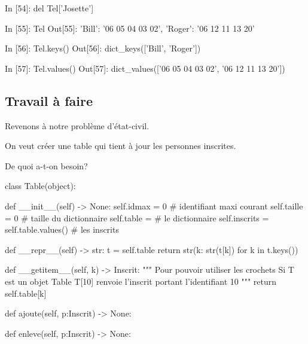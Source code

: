 \documentclass[french]{beamer}
\begin{document}
\begin{frame}[fragile]
\begin{pythoncode}
In [54]: del Tel['Josette']

In [55]: Tel
Out[55]: {'Bill': '06 05 04 03 02', 'Roger': '06 12 11 13 20'}
\end{pythoncode}

  \pause

\begin{pythoncode}
In [56]: Tel.keys()
Out[56]: dict_keys(['Bill', 'Roger'])

In [57]: Tel.values()
Out[57]: dict_values(['06 05 04 03 02', '06 12 11 13 20'])
\end{pythoncode}


\end{frame}



\subsection{Travail à faire}


\begin{frame}
  Revenons à notre problème d'état-civil.

  \pause

  On veut créer une table qui tient à jour les personnes inscrites.

  \pause

  De quoi a-t-on besoin?

  
\end{frame}

\begin{frame}[fragile]
\begin{pythoncode}
class Table(object):

    def __init__(self) -> None:
        self.idmax = 0 # identifiant maxi courant
        self.taille = 0 # taille du dictionnaire
        self.table = {} # le dictionnaire
        self.inscrits = self.table.values() # les inscrits

    def __repr__(self) -> str:
        t = self.table
        return str({k: str(t[k]) for k in t.keys()})

    def __getitem__(self, k) -> Inscrit:
        """ 
        Pour pouvoir utiliser les crochets
        Si T est un objet Table
        T[10] renvoie l'inscrit portant l'identifiant 10
        """
        return self.table[k]


    def ajoute(self, p:Inscrit) -> None:


    def enleve(self, p:Inscrit) -> None:
   
\end{pythoncode}


\end{frame}
\end{document}
